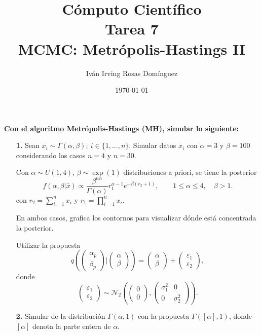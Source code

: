 \documentclass[letterpaper]{article}
\title{\textbf{Cómputo Científico\\
Tarea 7\\
MCMC: Metrópolis-Hastings II}}
\author{Iván Irving Rosas Domínguez}
\date{\today}
\newcommand{\1}{\mathds{1}}
\theoremstyle{definition}
\theoremstyle{definition}
\theoremstyle{definition}
\theoremstyle{definition}
\theoremstyle{definition}
\begin{document}
\maketitle


\textbf{Con el algoritmo Metrópolis-Hastings (MH), simular lo siguiente:}
\begin{itemize}
    \item[\textbf{1.}] Sean $x_i\sim\Gamma(\alpha,\beta); \ i\in \{1,...,n\}$. Simular datos $x_i$ 
    con $\alpha=3$ y $\beta=100$ considerando los casos $n=4$ y $n=30$.

    Con $\alpha\sim U(1,4)$, $\beta\sim \exp(1)$ distribuciones a priori, se tiene la
    posterior 
    \[
    f(\alpha,\beta|\bar{x})\propto\frac{\beta^{n\alpha}}{\Gamma(\alpha)}r_1^{\alpha-1}e^{-\beta(r_2+1)}, \qquad 1\leq \alpha\leq 4, \quad \beta>1.    
    \]
    con $r_2=\displaystyle \sum_{i=1}^nx_i$ y $r_1=\displaystyle\prod_{i=1}^{n}x_i$.

    En ambos casos, grafica los contornos para visualizar dónde está concentrada la posterior.

    Utilizar la propuesta 
    \[
    q \left( \begin{pmatrix}
        \alpha_p\\
        \beta_p
    \end{pmatrix} \Bigg|
    \begin{pmatrix}
        \alpha\\
        \beta
    \end{pmatrix}
    \right)= \begin{pmatrix}
        \alpha\\
        \beta
    \end{pmatrix}
    +
    \begin{pmatrix}
        \varepsilon_1\\
        \varepsilon_2
    \end{pmatrix},    
    \]
    donde 
    \[
    \begin{pmatrix}
        \varepsilon_1\\
        \varepsilon_2
    \end{pmatrix}    
    \sim 
    \mathcal{N}_2 \left( \begin{pmatrix}
        0\\
        0
    \end{pmatrix},
    \begin{pmatrix}
        \sigma_1^2 & 0\\
        0 & \sigma_2^2
    \end{pmatrix}\right).
    \]
    \item[\textbf{2.}] Simular de la distribución $\Gamma(\alpha,1)$ con la propuesta $\Gamma(\left[\alpha\right],1)$,
    donde $\left[\alpha\right]$ denota la parte entera de $\alpha$.
    \newline


\end{itemize}
\end{document}
